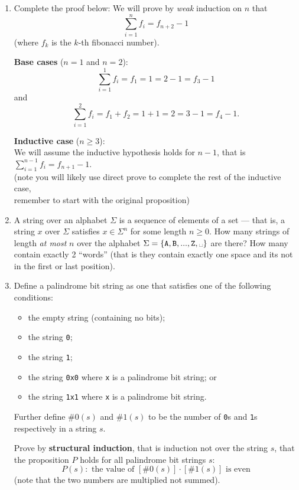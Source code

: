 \documentclass[11pt, oneside]{article}   	%
\begin{document}
\begin{enumerate}

\item Complete the proof below:
We will prove by \textit{weak} induction on $n$ that \[\sum_{i=1}^{n}f_i = f_{n+2}-1\] (where $f_k$ is the $k$-th fibonacci number). 

\textbf{Base cases} ($n=1$ and $n=2$):
 \[\sum_{i=1}^{1}f_i = f_1 = 1 = 2 - 1 = f_{3}-1\] and
 \[\sum_{i=1}^{2}f_i = f_1 + f_2 = 1 + 1 = 2 = 3 - 1 = f_{4}-1.\]
 
\textbf{Inductive case} ($n\ge 3$):\\
\hspace*{3em}We will assume the inductive hypothesis holds for $n-1$, that is $\sum_{i=1}^{n-1}f_i = f_{n+1}-1$. \\
\hspace*{3em} (note you will likely use direct prove to complete the rest of the inductive case,\\ 
\hspace*{3em} remember to start with the original proposition)

\item A string over an alphabet $\Sigma$ is a sequence of elements of a set --- that is, a string $x$ over $\Sigma$ satisfies $x \in \Sigma^n$ for some length $n\ge 0$.
How many strings of length \textit{at most} $n$ over the alphabet $\Sigma = \{\texttt{A},\texttt{B},...,\texttt{Z},\text{\textvisiblespace}\}$ are there? 
How many contain exactly 2 ``words'' (that is they contain exactly one space and its not in the first or last position). 

\clearpage
\item Define a palindrome bit string as one that satisfies one of the following conditions: 
\begin{itemize}
\item the empty string (containing no bits);
\item the string \texttt{0};
\item the string \texttt{1};
\item the string \texttt{0x0} where \texttt{x} is a palindrome bit string; or 
\item the string \texttt{1x1} where \texttt{x} is a palindrome bit string.
\end{itemize}
Further define $\#0(s)$ and $\#1(s)$ to be the number of \texttt{0}s and \texttt{1}s respectively in a string $s$.

Prove by \textbf{structural induction}, that is induction not over the string $s$, that the proposition $P$ holds for all palindrome bit strings $s$:
\[ P(s):\text{ the value of }[\#0(s)] \cdot [\#1(s)]\text{ is even} \]
(note that the two numbers are multiplied not summed).


\end{enumerate}
\end{document}

